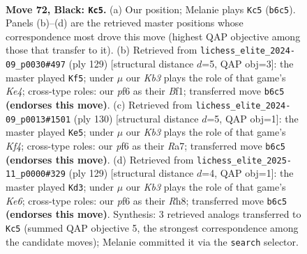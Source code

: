 \documentclass[11pt]{article}
\begin{document}
\clearpage

\begin{figure}[p]\centering
\begin{subfigure}{0.46\textwidth}\centering
\resizebox{\linewidth}{!}{%
\newchessgame
\chessboard[
  setfen={8/7R/1k3P2/8/B7/8/5K1P/8 b - - 2 72},
  showmover=false,
  pgfstyle=straightmove, color=movearrow, markmove={b6-c5}
]}
\caption{}
\end{subfigure}\hfill
\begin{subfigure}{0.46\textwidth}\centering
\resizebox{\linewidth}{!}{%
\newchessgame
\chessboard[
  setfen={8/8/1R4P1/4k3/7K/8/8/5b2 b - - 0 65},
  showmover=false,
  pgfstyle=straightmove, color=movearrow, markmove={e5-f5}
]}
\caption{}
\end{subfigure}
\\[4pt]
\begin{subfigure}{0.46\textwidth}\centering
\resizebox{\linewidth}{!}{%
\newchessgame
\chessboard[
  setfen={8/R7/2p4k/8/5K2/8/2r5/8 w - - 4 66},
  showmover=false,
  pgfstyle=straightmove, color=movearrow, markmove={f4-e5}
]}
\caption{}
\end{subfigure}\hfill
\begin{subfigure}{0.46\textwidth}\centering
\resizebox{\linewidth}{!}{%
\newchessgame
\chessboard[
  setfen={7r/8/2K5/8/PR6/4k3/8/8 b - - 0 65},
  showmover=false,
  pgfstyle=straightmove, color=movearrow, markmove={e3-d3}
]}
\caption{}
\end{subfigure}
\caption{\textbf{Move 72, Black: \texttt{Kc5}.} (a) Our position; Melanie plays \texttt{Kc5} (\texttt{b6c5}). Panels (b)--(d) are the retrieved master positions whose correspondence most drove this move (highest QAP objective among those that transfer to it). (b) Retrieved from \texttt{lichess\_elite\_2024-09\_p0030\#497} (ply 129) [structural distance $d$=5, QAP obj=3]: the master played \texttt{Kf5}; under $\mu$ our \emph{Kb3} plays the role of that game's \emph{Ke4}; cross-type roles: our \emph{p}f6 as their \emph{B}f1; transferred move \texttt{b6c5} \textbf{(endorses this move)}. (c) Retrieved from \texttt{lichess\_elite\_2024-09\_p0013\#1501} (ply 130) [structural distance $d$=5, QAP obj=1]: the master played \texttt{Ke5}; under $\mu$ our \emph{Kb3} plays the role of that game's \emph{Kf4}; cross-type roles: our \emph{p}f6 as their \emph{R}a7; transferred move \texttt{b6c5} \textbf{(endorses this move)}. (d) Retrieved from \texttt{lichess\_elite\_2025-11\_p0000\#329} (ply 129) [structural distance $d$=4, QAP obj=1]: the master played \texttt{Kd3}; under $\mu$ our \emph{Kb3} plays the role of that game's \emph{Ke6}; cross-type roles: our \emph{p}f6 as their \emph{R}h8; transferred move \texttt{b6c5} \textbf{(endorses this move)}. Synthesis: 3 retrieved analogs transferred to \texttt{Kc5} (summed QAP objective 5, the strongest correspondence among the candidate moves); Melanie committed it via the \texttt{search} selector.}
\label{fig:thought-m143}
\end{figure}
\end{document}

